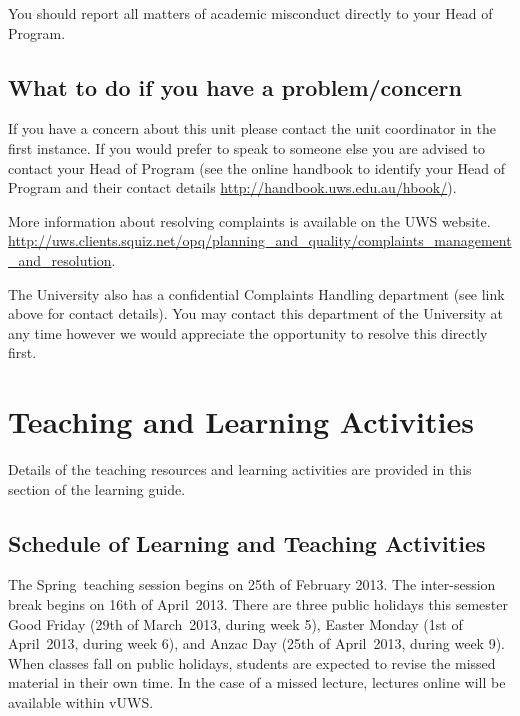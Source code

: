 \documentclass[a4paper,oneside]{book}
\newcommand{\vuws}{vUWS}
\newcommand{\teachingsession}{Spring}
\newcommand{\teachingsessiondate}{25th of February}
\newcommand{\teachingyear}{2013}
\newcommand{\intersessionbreak}{16th of April}
\newcommand{\goodfridaydate}{29th of March}
\newcommand{\goodfridayweek}{5}
\newcommand{\eastermondaydate}{1st of April}
\newcommand{\eastermondayweek}{6}
\newcommand{\anzacdaydate}{25th of April}
\newcommand{\anzacdayweek}{9}
\newcommand{\publicholidays}{
There are three public holidays
this semester Good Friday (\goodfridaydate~\teachingyear, during week
\goodfridayweek), Easter Monday (\eastermondaydate~\teachingyear,
during week \eastermondayweek), and Anzac Day
(\anzacdaydate~\teachingyear, during week \anzacdayweek).}
\begin{document}
You should report all matters of academic misconduct directly to your
Head of Program.

\section{What to do if you have a problem/concern}

If you have a concern about this unit please contact the unit
coordinator in the first instance.  If you would prefer to speak to
someone else you are advised to contact your Head of Program (see the
online handbook to identify your Head of Program and their contact
details \url{http://handbook.uws.edu.au/hbook/}).

More information about resolving complaints is available on the UWS
website. \url{http://uws.clients.squiz.net/opq/planning_and_quality/complaints_management_and_resolution}.

The University also has a confidential Complaints Handling department
(see link above for contact details).  You may contact this department
of the University at any time however we would appreciate the
opportunity to resolve this directly first.



\chapter{Teaching and Learning Activities}

Details of the teaching resources and learning activities are provided
in this section of the learning guide.


\section{Schedule of Learning and Teaching Activities}
The \teachingsession~teaching session begins on \teachingsessiondate
\teachingyear.  The inter-session break begins on
\intersessionbreak~\teachingyear.  \publicholidays~
When classes
fall on public holidays, students are expected to revise the missed
material in their own time. In the case of a missed lecture, lectures
online will be available within \vuws.
\end{document}
